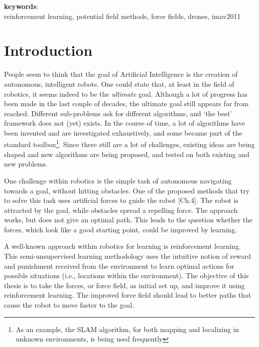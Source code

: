 \documentclass[11pt]{article}
\begin{document}
\vspace{1cm}

\textbf{keywords}: \\
reinforcement learning, potential field methods, force fields, drones, imav2011
\pagebreak


\thispagestyle{empty} %
\tableofcontents
\pagebreak



\setcounter{page}{2}
\section{Introduction}
\label{sec:intro}


People seem to think that the goal of Artificial Intelligence is the creation of autonomous, intelligent robots. One could state that, at least in the field of robotics, it seems indeed to be the \emph{ultimate} goal. Although a lot of progress has been made in the last couple of decades, the ultimate goal still appears far from reached. Different sub-problems ask for different algorithms, and `the best' framework does not (yet) exists. In the course of time, a lot of algorithms have been invented and are investigated exhaustively, and some became part of the standard toolbox\footnote{As an example, the SLAM algorithm, for both mapping and localizing in unknown environments, is being used frequently}. Since there still are a lot of challenges, existing ideas are being shaped and new algorithms are being proposed, and tested on both existing and new problems.

One challenge within robotics is the simple task of autonomous navigating towards a goal, without hitting obstacles. One of the proposed methods that try to solve this task uses artificial forces to guide the robot \cite{choset}[Ch.4]. The robot is attracted by the goal, while obstacles spread a repelling force. The approach works, but does not give an optimal path. This leads to the question whether the forces, which look like a good starting point, could be improved by learning.

A well-known approach within robotics for learning is reinforcement learning. This semi-unsupervised learning methodology uses the intuitive notion of reward and punishment received from the environment to learn optimal actions for possible situations (i.e., locations within the environment). The objective of this thesis is to take the forces, or force field, as initial set up, and improve it using reinforcement learning. The improved force field should lead to better paths that cause the robot to move faster to the goal.
\end{document}

